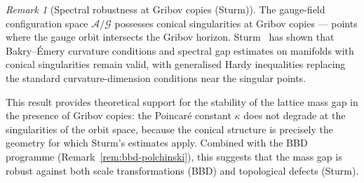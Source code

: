 \documentclass[12pt,a4paper]{article}
\theoremstyle{definition}
\theoremstyle{plain}
\theoremstyle{remark}
\newtheorem{remark}[definition]{Remark}
\begin{document}
\begin{remark}[Spectral robustness at Gribov copies (Sturm)]
\label{rem:sturm-gribov}
The gauge-field configuration space $\mathcal{A}/\mathcal{G}$ possesses conical singularities at Gribov copies --- points where the gauge orbit intersects the Gribov horizon. Sturm~\cite{Sturm2025} has shown that Bakry--\'Emery curvature conditions and spectral gap estimates on manifolds with conical singularities remain valid, with generalised Hardy inequalities replacing the standard curvature-dimension conditions near the singular points.

This result provides theoretical support for the stability of the lattice mass gap in the presence of Gribov copies: the Poincar\'e constant $\kappa$ does not degrade at the singularities of the orbit space, because the conical structure is precisely the geometry for which Sturm's estimates apply. Combined with the BBD programme (Remark~\ref{rem:bbd-polchinski}), this suggests that the mass gap is robust against both scale transformations (BBD) and topological defects (Sturm).
\end{remark}

\begin{center}
\end{center}
\end{document}
